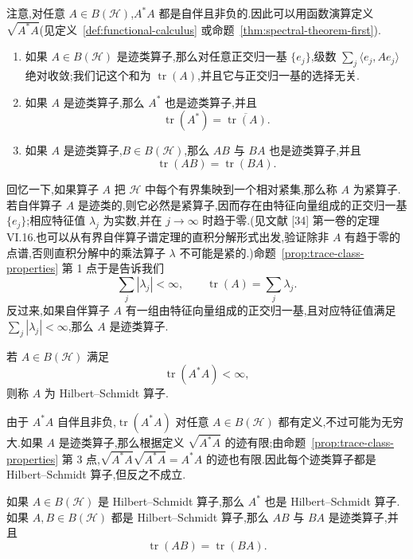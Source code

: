 注意,对任意 $A\in B(\mathcal H)$,$A^*A$ 都是自伴且非负的.因此可以用函数演算定义 $\sqrt{A^*A}$(见定义~\ref{def:functional-calculus} 或命题~\ref{thm:spectral-theorem-first}).

\begin{proposition}[迹类算子的基本性质]\label{prop:trace-class-properties}
\begin{enumerate}
\item 如果 $A\in B(\mathcal H)$ 是迹类算子,那么对任意正交归一基 $\{e_j\}$,级数 $\sum_j\langle e_j,Ae_j\rangle$ 绝对收敛;我们记这个和为 $\operatorname{tr}(A)$,并且它与正交归一基的选择无关.
\item 如果 $A$ 是迹类算子,那么 $A^*$ 也是迹类算子,并且
\[
 \operatorname{tr}(A^*)=\overline{\operatorname{tr}(A)}.
\]
\item 如果 $A$ 是迹类算子,$B\in B(\mathcal H)$,那么 $AB$ 与 $BA$ 也是迹类算子,并且
\[
 \operatorname{tr}(AB)=\operatorname{tr}(BA).
\]
\end{enumerate}
\end{proposition}

回忆一下,如果算子 $A$ 把 $\mathcal H$ 中每个有界集映到一个相对紧集,那么称 $A$ 为紧算子.若自伴算子 $A$ 是迹类的,则它必然是紧算子,因而存在由特征向量组成的正交归一基 $\{e_j\}$;相应特征值 $\lambda_j$ 为实数,并在 $j\to\infty$ 时趋于零.(见文献 [34] 第一卷的定理 VI.16.也可以从有界自伴算子谱定理的直积分解形式出发,验证除非 $A$ 有趋于零的点谱,否则直积分解中的乘法算子 $\lambda$ 不可能是紧的.)命题~\ref{prop:trace-class-properties} 第 1 点于是告诉我们
\[
 \sum_j|\lambda_j|<\infty,\qquad
 \operatorname{tr}(A)=\sum_j\lambda_j.
\]
反过来,如果自伴算子 $A$ 有一组由特征向量组成的正交归一基,且对应特征值满足 $\sum_j|\lambda_j|<\infty$,那么 $A$ 是迹类算子.

\begin{definition}\label{def:hilbert-schmidt}
若 $A\in B(\mathcal H)$ 满足
\[
 \operatorname{tr}(A^*A)<\infty,
\]
则称 $A$ 为 Hilbert--Schmidt 算子.
\end{definition}

由于 $A^*A$ 自伴且非负,$\operatorname{tr}(A^*A)$ 对任意 $A\in B(\mathcal H)$ 都有定义,不过可能为无穷大.如果 $A$ 是迹类算子,那么根据定义 $\sqrt{A^*A}$ 的迹有限;由命题~\ref{prop:trace-class-properties} 第 3 点,$\sqrt{A^*A}\sqrt{A^*A}=A^*A$ 的迹也有限.因此每个迹类算子都是 Hilbert--Schmidt 算子,但反之不成立.

\begin{proposition}\label{prop:hilbert-schmidt-products}
如果 $A\in B(\mathcal H)$ 是 Hilbert--Schmidt 算子,那么 $A^*$ 也是 Hilbert--Schmidt 算子.如果 $A,B\in B(\mathcal H)$ 都是 Hilbert--Schmidt 算子,那么 $AB$ 与 $BA$ 是迹类算子,并且
\[
 \operatorname{tr}(AB)=\operatorname{tr}(BA).
\]
\end{proposition}

